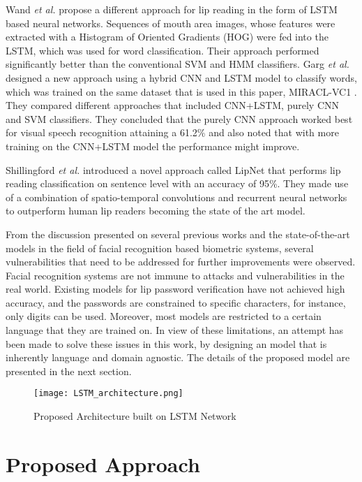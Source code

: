 \documentclass[letterpaper]{article}
\begin{document}
Wand \textit{et al.} \cite{liplstm} propose a different approach for lip reading in the form of LSTM based neural networks. Sequences of mouth area images, whose features were extracted with a Histogram of Oriented Gradients (HOG) were fed into the LSTM, which was used for word classification. Their approach performed significantly better than the conventional SVM and HMM classifiers. Garg \textit{et al.} \cite{stanford} designed a new approach using a hybrid CNN and LSTM model to classify words, which was trained on the same dataset that is used in this paper, MIRACL-VC1 \cite{dataset}. They compared different approaches that included CNN+LSTM, purely CNN and SVM classifiers. They concluded that the purely CNN approach worked best for visual speech recognition attaining a 61.2\% and also noted that with more training on the CNN+LSTM model the performance might improve.

Shillingford \textit{et al.} \cite{DBLP:journals/corr/abs-1807-05162} introduced a novel approach called LipNet that performs lip reading classification on sentence level with an accuracy of 95\%. They made use of a combination of spatio-temporal convolutions and recurrent neural networks to outperform human lip readers becoming the state of the art model.

From the discussion presented on several previous works and the state-of-the-art models in the field of facial recognition based biometric systems, several vulnerabilities that need to be addressed for further improvements were observed. Facial recognition systems are not immune to attacks and vulnerabilities in the real world. Existing models for lip password verification have not achieved high accuracy, and the passwords are constrained to specific characters, for instance, only digits can be used. Moreover, most models are restricted to a certain language that they are trained on. In view of these limitations, an attempt has been made to solve these issues in this work, by designing an model that is inherently language and domain agnostic. The details of the proposed model are presented in the next section.
\\
\vspace{-1em}
\begin{figure*}[ht]
    \centering
    \texttt{[image: LSTM\_architecture.png]}
    \caption{Proposed Architecture built on LSTM Network}
    \label{fig:LSTM}
\end{figure*}

\section{Proposed Approach}
\end{document}
